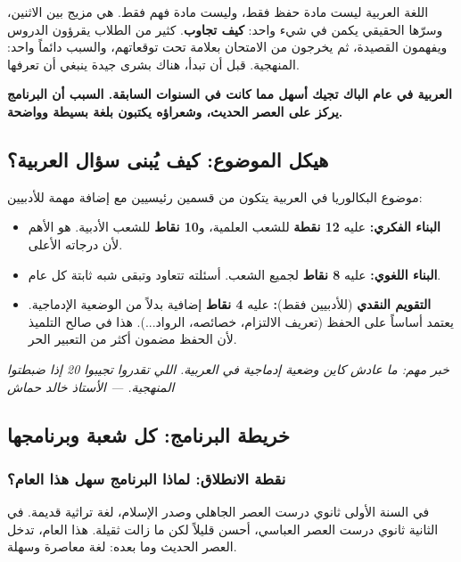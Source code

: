 \documentclass[12pt,a4paper]{book}
\newcommand{\quoteAr}[1]{%
	\begin{myquote}
		\itshape #1
	\end{myquote}
}
\newcommand{\importantAr}[1]{%
	\begin{important}
		\bfseries #1
	\end{important}
}
\begin{document}
	اللغة العربية ليست مادة حفظ فقط، وليست مادة فهم فقط. هي مزيج بين الاثنين، وسرّها الحقيقي يكمن في شيء واحد: \textbf{كيف تجاوب}. كثير من الطلاب يقرؤون الدروس ويفهمون القصيدة، ثم يخرجون من الامتحان بعلامة تحت توقعاتهم، والسبب دائماً واحد: المنهجية. قبل أن تبدأ، هناك بشرى جيدة ينبغي أن تعرفها.
	
	\importantAr{العربية في عام الباك تجيك أسهل مما كانت في السنوات السابقة. السبب أن البرنامج يركز على العصر الحديث، وشعراؤه يكتبون بلغة بسيطة وواضحة.}
	
	\subsection{هيكل الموضوع: كيف يُبنى سؤال العربية؟}
	
	موضوع البكالوريا في العربية يتكون من قسمين رئيسيين مع إضافة مهمة للأدبيين:
	
	\begin{itemize}
		\item \textbf{البناء الفكري:} عليه \textbf{12 نقطة} للشعب العلمية، و\textbf{10 نقاط} للشعب الأدبية. هو الأهم لأن درجاته الأعلى.
		\item \textbf{البناء اللغوي:} عليه \textbf{8 نقاط} لجميع الشعب. أسئلته تتعاود وتبقى شبه ثابتة كل عام.
		\item \textbf{التقويم النقدي} (للأدبيين فقط)\textbf{:} عليه \textbf{4 نقاط} إضافية بدلاً من الوضعية الإدماجية. يعتمد أساساً على الحفظ (تعريف الالتزام، خصائصه، الرواد...). هذا في صالح التلميذ لأن الحفظ مضمون أكثر من التعبير الحر.
	\end{itemize}
	
	\quoteAr{خبر مهم: ما عادش كاين وضعية إدماجية في العربية. اللي تقدروا تجيبوا 20 إذا ضبطتوا المنهجية. — الأستاذ خالد حماش}
	
	\subsection{خريطة البرنامج: كل شعبة وبرنامجها}
	
	\subsubsection*{نقطة الانطلاق: لماذا البرنامج سهل هذا العام؟}
	
	في السنة الأولى ثانوي درست العصر الجاهلي وصدر الإسلام، لغة تراثية قديمة. في الثانية ثانوي درست العصر العباسي، أحسن قليلاً لكن ما زالت ثقيلة. هذا العام، تدخل العصر الحديث وما بعده: لغة معاصرة وسهلة.
	
\end{document}
